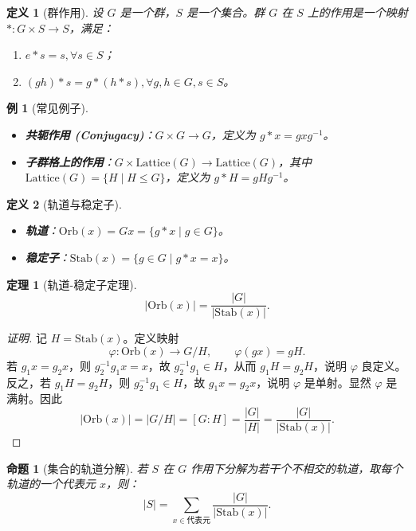 \documentclass[11pt,a4paper]{ctexart}
\newtheorem*{theorem}{定理}
\newtheorem*{definition}{定义}
\newtheorem*{example}{例}
\newtheorem*{proposition}{命题}
\theoremstyle{remark}
\begin{document}
\begin{definition}[群作用]
设 \(G\) 是一个群，\(S\) 是一个集合。群 \(G\) 在 \(S\) 上的作用是一个映射 \(*: G \times S \to S\)，满足：
\begin{enumerate}
    \item \(e * s = s, \forall s \in S\)；
    \item \((gh) * s = g * (h * s), \forall g,h \in G, s \in S\)。
\end{enumerate}
\end{definition}

\begin{example}[常见例子]
\begin{itemize}
    \item \textbf{共轭作用 (Conjugacy)}：\(G \times G \to G\)，定义为 \(g * x = gxg^{-1}\)。
    \item \textbf{子群格上的作用}：\(G \times \mathrm{Lattice}(G) \to \mathrm{Lattice}(G)\)，其中 \(\mathrm{Lattice}(G) = \{H \mid H \le G\}\)，定义为 \(g * H = gHg^{-1}\)。
\end{itemize}
\end{example}

\begin{definition}[轨道与稳定子]
\begin{itemize}
    \item \textbf{轨道}：\(\mathrm{Orb}(x) = Gx = \{g * x \mid g \in G\}\)。
    \item \textbf{稳定子}：\(\mathrm{Stab}(x) = \{g \in G \mid g * x = x\}\)。
\end{itemize}
\end{definition}

\begin{theorem}[轨道-稳定子定理]
\[
|\mathrm{Orb}(x)| = \frac{|G|}{|\mathrm{Stab}(x)|}.
\]
\end{theorem}

\begin{proof}[证明]
记 \(H=\mathrm{Stab}(x)\)。定义映射
\[
\varphi:\mathrm{Orb}(x)\to G/H,\qquad \varphi(gx)=gH.
\]
若 \(g_1x=g_2x\)，则 \(g_2^{-1}g_1x=x\)，故 \(g_2^{-1}g_1\in H\)，从而 \(g_1H=g_2H\)，说明 \(\varphi\) 良定义。反之，若 \(g_1H=g_2H\)，则 \(g_2^{-1}g_1\in H\)，故 \(g_1x=g_2x\)，说明 \(\varphi\) 是单射。显然 \(\varphi\) 是满射。因此
\[
|\mathrm{Orb}(x)|=|G/H|=[G:H]=\frac{|G|}{|H|}
=\frac{|G|}{|\mathrm{Stab}(x)|}.
\]
\end{proof}

\begin{proposition}[集合的轨道分解]
若 \(S\) 在 \(G\) 作用下分解为若干个不相交的轨道，取每个轨道的一个代表元 \(x\)，则：
\[
|S| = \sum_{x \in \text{代表元}} \frac{|G|}{|\mathrm{Stab}(x)|}.
\]
\end{proposition}
\end{document}
